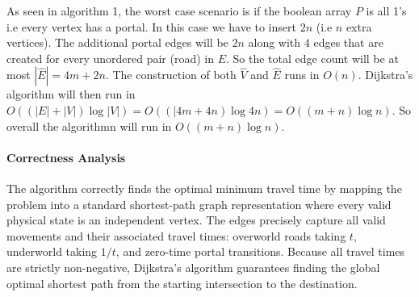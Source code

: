\documentclass[11pt]{article}
\begin{document}


    
    
    



As seen in algorithm 1, the worst case scenario is if the boolean array $P$ is all 1's i.e every vertex has a portal. 
In this case we have to insert $2n$ (i.e $n$ extra vertices). The additional portal edges will be $2n$ along with $4$ edges that are created for every unordered pair (road) in $E$.
So the total edge count will be at most $|\hat{E}| = 4m+2n$. The construction of both $\hat{V}$ and $\hat{E}$ runs in $O(n)$. Dijkstra's algorithm will then run 
in $O((|E|+|V|)\log|V|) = O((|4m+4n)\log 4n) = O((m+n)\log n)$. So overall the algorithmn will run in $O((m+n)\log n)$.
\paragraph{Correctness Analysis}
The algorithm correctly finds the optimal minimum travel time by mapping the problem into a 
standard shortest-path graph representation where every valid physical state is an independent 
vertex. The edges precisely capture all valid movements and their associated travel times: 
overworld roads taking $t$, underworld taking $1/t$, and zero-time portal transitions. 
Because all travel times are strictly non-negative, Dijkstra's algorithm  guarantees 
finding the global optimal shortest path from the starting intersection to the destination.
\newpage
\end{document}
